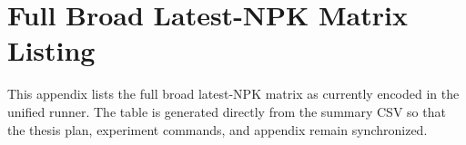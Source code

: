 \chapter{Full Broad Latest-NPK Matrix Listing}

This appendix lists the full broad latest-NPK matrix as currently encoded in the unified runner. The table is generated directly from the summary CSV so that the thesis plan, experiment commands, and appendix remain synchronized.


